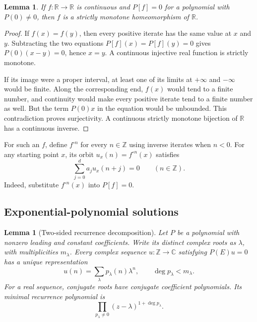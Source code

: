 \documentclass[11pt,letterpaper]{article}
\newtheorem{lemma}[theorem]{Lemma}
\theoremstyle{definition}
\theoremstyle{remark}
\newcommand{\R}{\mathbb R}
\newcommand{\C}{\mathbb C}
\newcommand{\Z}{\mathbb Z}
\newcommand{\itn}[2]{#1^{\circ #2}}
\newcommand{\degree}{\operatorname{deg}}
\begin{document}
\begin{lemma}
\label{lem:homeo}
If $f:\R\to\R$ is continuous and $P[f]=0$ for a polynomial with
$P(0)\ne0$, then $f$ is a strictly monotone homeomorphism of $\R$.
\end{lemma}

\begin{proof}
If $f(x)=f(y)$, then every positive iterate has the same value at $x$ and
$y$. Subtracting the two equations $P[f](x)=P[f](y)=0$ gives
$P(0)(x-y)=0$, hence $x=y$. A continuous injective real function is
strictly monotone.

If its image were a proper interval, at least one of its limits at
$+\infty$ and $-\infty$ would be finite. Along the corresponding end,
$f(x)$ would tend to a finite number, and continuity would make every
positive iterate tend to a finite number as well. But the term $P(0)x$
in the equation would be unbounded. This contradiction proves
surjectivity. A continuous strictly monotone bijection of $\R$ has a
continuous inverse.
\end{proof}

For such an $f$, define $\itn{f}{n}$ for every $n\in\Z$ using inverse
iterates when $n<0$. For any starting point $x$, its orbit
$u_x(n)=\itn{f}{n}(x)$ satisfies
\begin{equation}
  \sum_{j=0}^d a_j u_x(n+j)=0\qquad(n\in\Z).
  \label{eq:recurrence}
\end{equation}
Indeed, substitute $\itn{f}{n}(x)$ into $P[f]=0$.

\subsection{Exponential-polynomial solutions}

\begin{lemma}[Two-sided recurrence decomposition]
\label{lem:recurrence}
Let $P$ be a polynomial with nonzero leading and constant coefficients.
Write its distinct complex roots as $\lambda$, with multiplicities
$m_\lambda$. Every complex sequence $u:\Z\to\C$ satisfying
$P(E)u=0$ has a unique representation
\begin{equation}
  u(n)=\sum_\lambda p_\lambda(n)\lambda^n,
  \qquad \degree p_\lambda<m_\lambda.
  \label{eq:expoly}
\end{equation}
For a real sequence, conjugate roots have conjugate coefficient
polynomials. Its minimal recurrence polynomial is
\begin{equation}
  \prod_{p_\lambda\ne0}
     (z-\lambda)^{1+\degree p_\lambda}.
  \label{eq:minrec}
\end{equation}
\end{lemma}
\end{document}
